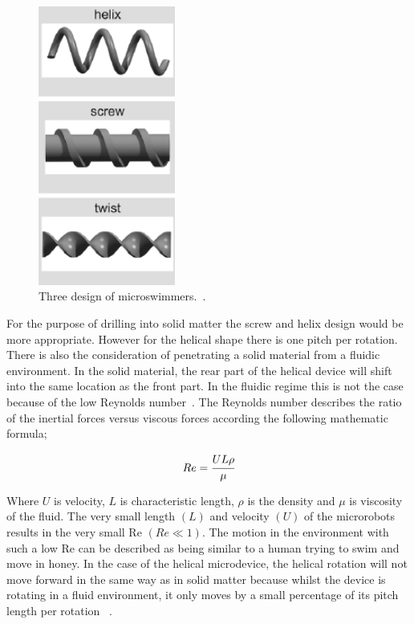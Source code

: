 \documentclass[a4paper,11pt]{article}
\begin{document}
\begin{sloppypar}
\begin{figure}
  \centering
    \includegraphics[width=0.4\textwidth]{HelixShapes}
  \caption{Three design of microswimmers.~\citep{peyer2013magnetic}.}
  \label{HelixShapes}
\end{figure}

For the purpose of drilling into solid matter the screw and helix design would be more appropriate.
 However for the helical shape there is one pitch per rotation. There is also the consideration of penetrating
 a solid material from a fluidic environment. In the solid material, the rear part of the helical device will shift 
into the same location as the front part. In the fluidic regime this is not the case because of the low
 Reynolds number~\citep{peyer2013magnetic}. The Reynolds number describes the ratio of the inertial forces versus viscous 
forces according the following mathematic formula;

\begin{equation}
  Re = \cfrac{UL\rho}{\mu}
\label{eq:4}
\end{equation}
 
Where $ U$ is velocity, $L$ is characteristic length, $\rho$ is the density and $\mu$ is viscosity of the fluid.
The very small length $(L)$ and velocity $(U)$ of the microrobots results in the very small Re $(Re\ll1)$. 
The motion in the environment with such a low Re can be described as being similar to a human
 trying to swim and move in honey. In the case of the helical microdevice, the helical rotation will not move 
forward in the same way as in solid matter because whilst the device is rotating in a fluid environment, 
it only moves by a small percentage of its pitch length per rotation ~\citep{peyer2013magnetic}. 


\end{sloppypar}
\end{document}
